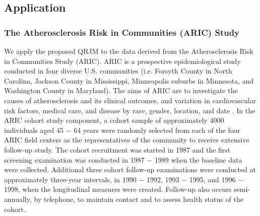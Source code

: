 



% 
\subsection{Application}\label{sec:p2data}
\subsubsection{The Atherosclerosis Risk in Communities (ARIC) Study}\label{sec:p2data_analysis}
We apply the proposed QRJM to the data derived from the Atherosclerosis Risk in Communities Study (ARIC). ARIC is a prospective epidemiological study conducted in four diverse U.S. communities (i.e. Forsyth County in North Carolina, Jackson County in Mississippi, Minneapolis suburbs in Minnesota, and Washington County in Maryland). The aims of ARIC are to investigate the causes of atherosclerosis and its clinical outcomes, and variation in cardiovascular risk factors, medical care, and disease by race, gender, location, and date \citep{aric1989atherosclerosis}. In the ARIC cohort study component, a cohort sample of approximately 4000 individuals aged 45 $-$ 64 years were randomly selected from each of the four ARIC field centers as the representatives of the community to receive extensive follow-up study. The cohort recruitment was started in 1987 and the first screening examination was conducted in 1987 $-$ 1989 when the baseline data were collected. Additional three cohort follow-up examinations were conducted at approximately three-year intervals, in 1990 $-$ 1992, 1993 $-$ 1995, and 1996 $-$ 1998, when the longitudinal measures were created. Follow-up also occurs semi-annually, by telephone, to maintain contact and to assess health status of the cohort.

